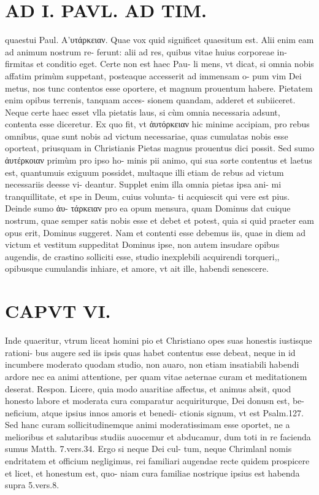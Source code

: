 \documentclass{article}
\begin{document}
\begin{pages}
\section*{AD I. PAVL. AD TIM. }
\marginpar{[ p.434 ]}\pstart quaestui Paul. Α’υτάρκειαν. Quae vox quid significet quaesitum est. Alii enim eam ad animum nostrum re- ferunt: alii ad res, quibus vitae huius corporeae in- firmitas et conditio eget. Certe non est haec Pau- li mens, vt dicat, si omnia nobis affatim primùm suppetant, posteaque accesserit ad immensam o- pum vim Dei metus, nos tunc contentos esse oportere, et magnum prouentum habere.  \pend\pstart Pietatem enim opibus terrenis, tanquam acces- sionem quandam, adderet et subiiceret. Neque certe haec esset vlla pietatis laus, si cùm omnia necessaria adsunt, contenta esse diceretur. Ex quo fit, vt ἀυτόρκειαν hic minime accipiam, pro rebus omnibus, quae sunt nobis ad victum necessariae, quas cumulatas nobis esse oporteat, priusquam in Christianis Pietas magnus prouentus dici possit. Sed sumo ἀυτέρκοιαν primùm pro ipso ho- minis pii animo, qui sua sorte contentus et laetus est, quantumuis exiguum possidet, multaque illi etiam de rebus ad victum necessariis deesse vi- deantur. Supplet enim illa omnia pietas ipsa ani- mi tranquillitate, et spe in Deum, cuius volunta- ti acquiescit qui vere est pius. Deinde sumo ἀυ- τάρκειαν pro ea opum mensura, quam Dominus dat cuique nostrum, quae semper satis nobis esse et debet et potest, quia si quid praeter eam opus erit, Dominus suggeret. Nam et contenti esse debemus iis, quae in diem ad victum et vestitum suppeditat Dominus ipse, non autem insudare opibus augendis, de crastino solliciti esse, studio inexplebili acquirendi torqueri,, opibusque cumulandis inhiare, et amore, vt ait ille, habendi senescere.  \pend
\section*{CAPVT  VI. }
\marginpar{[ p.435 ]}\pstart Inde quaeritur, vtrum liceat homini pio et Christiano opes suas honestis iustisque rationi- bus augere sed iis ipsis quas habet contentus esse debeat, neque in id incumbere moderato quodam studio, non auaro, non etiam insatiabili habendi ardore nec ea animi attentione, per quam vitae aeternae curam et meditationem deserat. Respon. Licere, quia modo auaritiae affectus, et animus absit, quod honesto labore et moderata cura comparatur acquiriturque, Dei donusn est, be- neficium, atque ipsius innos amoris et benedi- ctionis signum, vt est Psalm.127. Sed hanc curam sollicitudinemque animi moderatissimam esse oportet, ne a melioribus et salutaribus studiis auocemur et abducamur, dum toti in re facienda sumus Matth. 7.vers.34. Ergo si neque Dei cul- tum, neque Chrimlanl nomis endritatem et officium negligimus, rei familiari augendae recte quidem prospicere et licet, et honestum est, quo- niam cura familiae nostrique ipsius est habenda supra 5.vers.8.  \pend
{}
{}

\end{pages}
\end{document}
